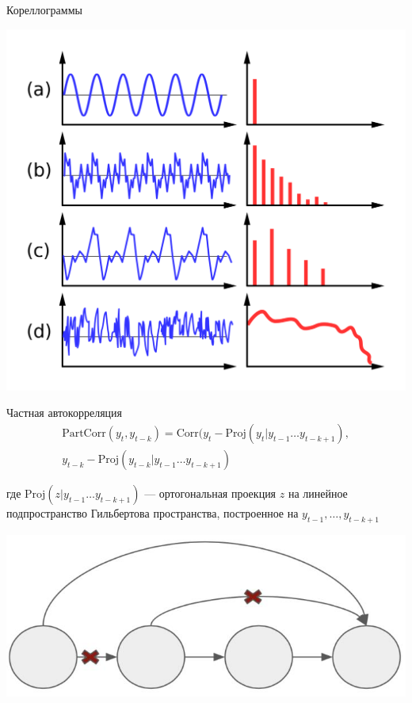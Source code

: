 \documentclass[fullscreen=true, bookmarks=true, hyperref={pdfencoding=unicode}]{beamer}
\begin{document}
\begin{frame}{Кореллограммы}

  \begin{center}
    \includegraphics[keepaspectratio,
                     width=.75\paperwidth]{correlograms.png}
  \end{center}

\end{frame}


\begin{frame}
  \begin{block}{Частная автокорреляция}
    \begin{align*}
      \text{PartCorr}(y_t, y_{t-k}) = \text{Corr}(y_t - \text{Proj}(y_t|y_{t-1}\dots y_{t-k+1}), \\
      y_{t-k} - \text{Proj}(y_{t-k}|y_{t-1}\dots y_{t-k+1})
    \end{align*}
  \end{block}

 где $\text{Proj}(z|y_{t-1}\dots y_{t-k+1})$ — ортогональная проекция $z$ на линейное подпространство Гильбертова пространства, построенное на ${y_{t-1},\dots ,y_{t-k+1}}$

 \begin{center}
   \includegraphics[keepaspectratio,
                    width=.4\paperwidth]{partial_autocorr.jpg}
 \end{center}
\end{frame}
\end{document}
